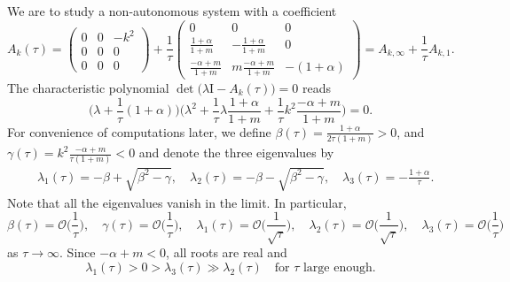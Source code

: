 \documentclass[a4paper,11pt]{article}
\theoremstyle{remark}
\begin{document}
We are to study a non-autonomous system with a coefficient
\begin{equation} \label{eq:n0A}
  A_k(\tau)=\begin{pmatrix}
   0 & 0 & -k^2\\
   0 & 0 & 0\\
   0 & 0 & 0
  \end{pmatrix}
  + \frac{1}{\tau}   \begin{pmatrix}
   0 & 0 & 0\\
   \frac{1+\alpha}{1+m} & -\frac{1+\alpha}{1+m} & 0\\
   \frac{-\alpha+m}{1+m} & m\frac{-\alpha+m}{1+m}& -(1+\alpha)
  \end{pmatrix} = A_{k,\infty} + \frac{1}{\tau}A_{k,1}.
\end{equation}
The characteristic polynomial $\det\big(\lambda \textrm{I} - A_k(\tau)\big)=0$ reads
$$ \Big(\lambda +\frac{1}{\tau}(1+\alpha)\Big)\Big( \lambda^2 + \frac{1}{\tau}\lambda \frac{1+\alpha}{1+m} + \frac{1}{\tau} k^2 \frac{-\alpha+m}{1+m}\Big)=0.$$
For convenience of computations later, we define $\beta(\tau) = \frac{1+\alpha}{2\tau(1+m)}>0$, and $\gamma(\tau)= k^2\frac{-\alpha+m}{\tau(1+m)}<0$ and denote the three eigenvalues by
\begin{equation} \label{eq:inviscid_roots}
\begin{aligned}
 &\lambda_1(\tau) = -\beta + \sqrt{\beta^2-\gamma}, \quad \lambda_2(\tau) = -\beta - \sqrt{\beta^2-\gamma}, \quad \lambda_3(\tau) = -\frac{1+\alpha}{\tau}.
\end{aligned}
\end{equation}
Note that all the eigenvalues vanish in the limit. In particular, 
$$ \beta(\tau)=\mathcal{O}\Big(\frac{1}{\tau}\Big), \quad \gamma(\tau)=\mathcal{O}\Big(\frac{1}{\tau}\Big), \quad \lambda_1(\tau)=\mathcal{O}\Big(\frac{1}{\sqrt{\tau}}\Big), \quad \lambda_2(\tau)=\mathcal{O}\Big(\frac{1}{\sqrt{\tau}}\Big), \quad\lambda_3(\tau)=\mathcal{O}\Big(\frac{1}{\tau}\Big)$$
as $\tau \rightarrow \infty$. Since $-\alpha+m<0$, all roots are real and 
$$\lambda_1(\tau) > 0 > \lambda_3(\tau) \gg \lambda_2(\tau) \quad \text{for $\tau$ large enough.}$$

% 
\end{document}
